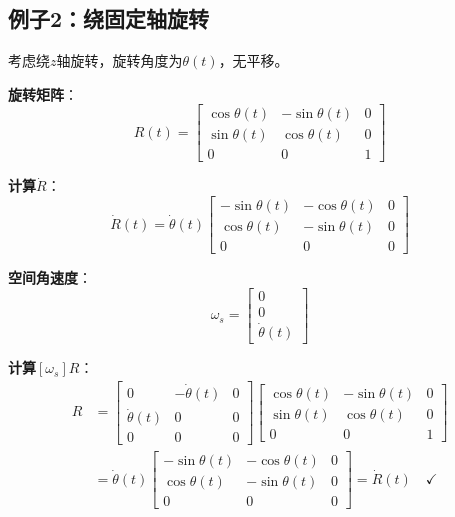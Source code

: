 \documentclass[12pt,a4paper]{article}
\begin{document}
\subsection{例子2：绕固定轴旋转}

考虑绕$z$轴旋转，旋转角度为$\theta(t)$，无平移。

\textbf{旋转矩阵}：
\begin{equation}
R(t) = \begin{bmatrix}
\cos\theta(t) & -\sin\theta(t) & 0 \\
\sin\theta(t) & \cos\theta(t) & 0 \\
0 & 0 & 1
\end{bmatrix}
\end{equation}

\textbf{计算$\dot{R}$}：
\begin{equation}
\dot{R}(t) = \dot{\theta}(t) \begin{bmatrix}
-\sin\theta(t) & -\cos\theta(t) & 0 \\
\cos\theta(t) & -\sin\theta(t) & 0 \\
0 & 0 & 0
\end{bmatrix}
\end{equation}

\textbf{空间角速度}：
\begin{equation}
\omega_s = \begin{bmatrix} 0 \\ 0 \\ \dot{\theta}(t) \end{bmatrix}
\end{equation}

\textbf{计算$[\omega_s]R$}：
\begin{align}
[\omega_s]R &= \begin{bmatrix}
0 & -\dot{\theta}(t) & 0 \\
\dot{\theta}(t) & 0 & 0 \\
0 & 0 & 0
\end{bmatrix} \begin{bmatrix}
\cos\theta(t) & -\sin\theta(t) & 0 \\
\sin\theta(t) & \cos\theta(t) & 0 \\
0 & 0 & 1
\end{bmatrix} \\
&= \dot{\theta}(t) \begin{bmatrix}
-\sin\theta(t) & -\cos\theta(t) & 0 \\
\cos\theta(t) & -\sin\theta(t) & 0 \\
0 & 0 & 0
\end{bmatrix} = \dot{R}(t) \quad \checkmark
\end{align}
\end{document}
